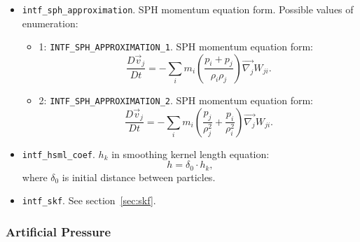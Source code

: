 \begin{itemize}
    \item \verb|intf_sph_approximation|. SPH momentum equation form. Possible values of enumeration:
    \begin{itemize}
        \item 1: \verb|INTF_SPH_APPROXIMATION_1|. SPH momentum equation form:
        \begin{equation}
            \frac{D\vec{v}_j}{D t} = 
            -\sum\limits_{i} m_{i} 
            \left(
            \frac{p_{i} + p_{j}}{\rho_{i} \rho_{j}}
            \right) \vec{\nabla_{j}} W_{ji}.
        \end{equation}
        
        \item 2: \verb|INTF_SPH_APPROXIMATION_2|. SPH momentum equation form:
        \begin{equation}
            \frac{D\vec{v}_j}{D t} = 
            -\sum\limits_{i} m_{i} 
            \left(
            \frac{p_{j}}{\rho_{j}^{2}} + 
            \frac{p_{i}}{\rho_{i}^{2}}
            \right) \vec{\nabla_{j}} W_{ji}.
        \end{equation}
    \end{itemize}

    \item \verb|intf_hsml_coef|. $h_{k}$ in smoothing kernel length equation:
    \begin{equation}
        h = \delta_{0} \cdot h_{k},
    \end{equation}
    where $\delta_{0}$ is initial distance between particles.

    \item \verb|intf_skf|. See section~\ref{sec:skf}.
\end{itemize}

\subsubsection{Artificial Pressure}

